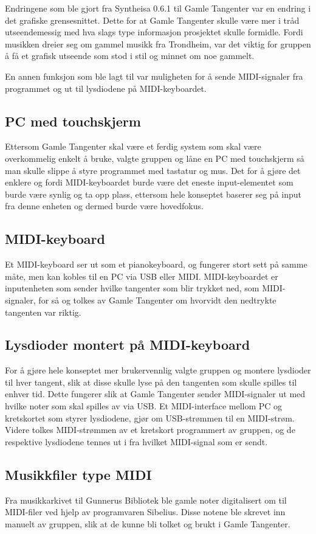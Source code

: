 Endringene som ble gjort fra Syntheisa 0.6.1 til Gamle Tangenter var en endring i det grafiske grensesnittet. Dette for at Gamle Tangenter skulle være mer i tråd utseendemessig med hva slags type informasjon prosjektet skulle formidle. Fordi musikken dreier seg om gammel musikk fra Trondheim, var det viktig for gruppen å få et grafisk utseende som stod i stil og minnet om noe gammelt.

En annen funksjon som ble lagt til var muligheten for å sende MIDI-signaler fra programmet og ut til lysdiodene på MIDI-keyboardet. 

\subsection{PC med touchskjerm}
Ettersom Gamle Tangenter skal være et ferdig system som skal være overkommelig enkelt å bruke, valgte gruppen og låne en PC med touchskjerm så man skulle slippe å styre programmet med tastatur og mus. Det for å gjøre det enklere og fordi MIDI-keyboardet burde være det eneste input-elementet som burde være synlig og ta opp plass, ettersom hele konseptet baserer seg på input fra denne enheten og dermed burde være hovedfokus. 

\subsection{MIDI-keyboard}
Et MIDI-keyboard ser ut som et pianokeyboard, og fungerer stort sett på samme måte, men kan kobles til en PC via USB eller MIDI. MIDI-keyboardet er inputenheten som sender hvilke tangenter som blir trykket ned, som MIDI-signaler, for så og tolkes av Gamle Tangenter om hvorvidt den nedtrykte tangenten var riktig. 

\subsection{Lysdioder montert på MIDI-keyboard}
For å gjøre hele konseptet mer brukervennlig valgte gruppen og montere lysdioder til hver tangent, slik at disse skulle lyse på den tangenten som skulle spilles til enhver tid. Dette fungerer slik at Gamle Tangenter sender MIDI-signaler ut med hvilke noter som skal spilles av via USB. Et MIDI-interface mellom PC og kretskortet som styrer lysdiodene, gjør om USB-strømmen til en MIDI-strøm. Videre tolkes MIDI-strømmen av et kretskort programmert av gruppen, og de respektive lysdiodene tennes ut i fra hvilket MIDI-signal som er sendt.

\subsection{Musikkfiler type MIDI}
Fra musikkarkivet til Gunnerus Bibliotek ble gamle noter digitalisert om til MIDI-filer ved hjelp av programvaren Sibelius\cite{sibelius}. Disse notene ble skrevet inn manuelt av gruppen, slik at de kunne bli tolket og brukt i Gamle Tangenter. 

